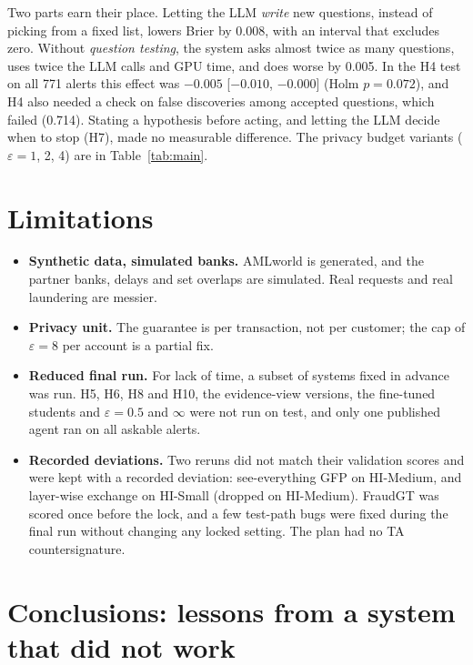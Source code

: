 \documentclass[11pt,a4paper]{article}
\newcommand{\eps}{\varepsilon}
\begin{document}
Two parts earn their place. Letting the LLM \emph{write} new questions, instead of picking from a fixed list, lowers Brier by 0.008, with an interval that excludes zero. Without \emph{question testing}, the system asks almost twice as many questions, uses twice the LLM calls and GPU time, and does worse by 0.005. In the H4 test on all 771 alerts this effect was $-0.005$ [$-0.010$, $-0.000$] (Holm $p=0.072$), and H4 also needed a check on false discoveries among accepted questions, which failed (0.714). Stating a hypothesis before acting, and letting the LLM decide when to stop (H7), made no measurable difference. The privacy budget variants ($\eps=1$, 2, 4) are in Table~\ref{tab:main}.

\section{Limitations}\label{sec:lim}

\begin{itemize}
\item \textbf{Synthetic data, simulated banks.} AMLworld is generated, and the partner banks, delays and set overlaps are simulated. Real requests and real laundering are messier.
\item \textbf{Privacy unit.} The guarantee is per transaction, not per customer; the cap of $\eps=8$ per account is a partial fix.
\item \textbf{Reduced final run.} For lack of time, a subset of systems fixed in advance was run. H5, H6, H8 and H10, the evidence-view versions, the fine-tuned students and $\eps=0.5$ and $\infty$ were not run on test, and only one published agent ran on all askable alerts.
\item \textbf{Recorded deviations.} Two reruns did not match their validation scores and were kept with a recorded deviation: see-everything GFP on HI-Medium, and layer-wise exchange on HI-Small (dropped on HI-Medium). FraudGT was scored once before the lock, and a few test-path bugs were fixed during the final run without changing any locked setting. The plan had no TA countersignature.
\end{itemize}

\section{Conclusions: lessons from a system that did not work}
\end{document}
